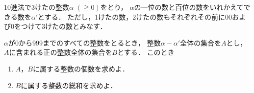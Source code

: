 \documentclass[../../main.tex]{subfiles}
\begin{document}
10進法で3けたの整数$\alpha$ $(\geqq0)$をとり，
$\alpha$の一位の数と百位の数をいれかえてできる数を$\alpha'$とする．
ただし，1けたの数，2けたの数もそれぞれその前に00および0をつけて3けたの数とみなす．

$\alpha$が0から999までのすべての整数をとるとき，
整数$\alpha-\alpha'$全体の集合を$A$とし，
$A$に含まれる正の整数全体の集合を$B$とする．
このとき
\begin{enumerate}
  \item $A$，$B$に属する整数の個数を求めよ．
  \item $B$に属する整数の総和を求めよ．
\end{enumerate}
\end{document}
